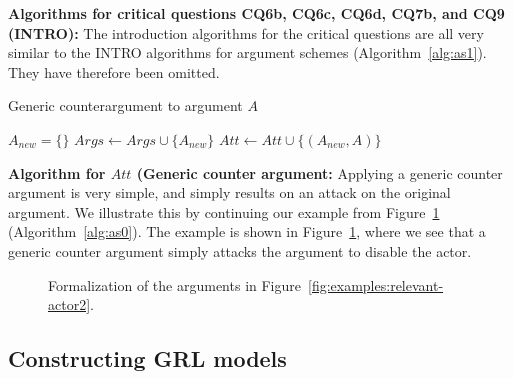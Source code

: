\noindent\textbf{Algorithms for critical questions CQ6b, CQ6c, CQ6d, CQ7b, and CQ9 (INTRO):} The introduction algorithms for the critical questions are all very similar to the INTRO algorithms for argument schemes (Algorithm~\ref{alg:as1}). They have therefore been omitted.

\begin{algorithm}[h]
  \caption{Generic counterargument to argument $A$}\label{alg:cq6b}
  \begin{algorithmic}[1]
    \State $A_{new} = \{\}$
    \State $Args \gets Args \cup \{A_{new}\}$
    \State $Att \gets Att \cup \{(A_{new},A)\}$
    \EndProcedure
  \end{algorithmic}
\end{algorithm}

\noindent\textbf{Algorithm for $Att$ (Generic counter argument:} Applying a generic counter argument is very simple, and simply results on an attack on the original argument. We illustrate this by continuing our example from Figure~\ref{fig:examples:relevant-actor2:formal} (Algorithm~\ref{alg:as0}). The example is shown in Figure~\ref{fig:examples:relevant-actor2:formal}, where we see that a generic counter argument simply attacks the argument to disable the actor.

\begin{figure}[ht!]
\centering
\caption{Formalization of the arguments in Figure~\ref{fig:examples:relevant-actor2}.}
\label{fig:examples:relevant-actor2:formal}
\end{figure}

\subsection{Constructing GRL models}
\label{sect:rationalGRL-GRL}

